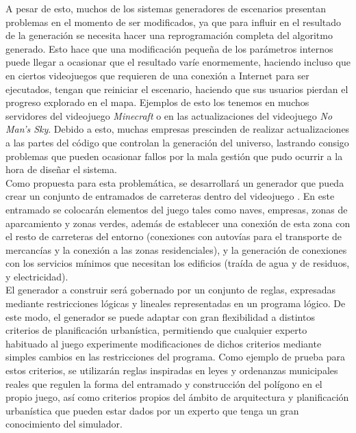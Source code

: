 A pesar de esto, muchos de los sistemas generadores de escenarios presentan problemas en el momento de ser modificados, ya que para influir en el resultado de la generación se necesita hacer una reprogramación completa del algoritmo generado. Esto hace que una modificación pequeña de los parámetros internos puede llegar a ocasionar que el resultado varíe enormemente, haciendo incluso que en ciertos videojuegos que requieren de una conexión a Internet para ser ejecutados, tengan que reiniciar el escenario, haciendo que sus usuarios pierdan el progreso explorado en el mapa. Ejemplos de esto los tenemos en muchos servidores del videojuego \textit{Minecraft} o en las actualizaciones del videojuego \textit{No Man's Sky}. Debido a esto, muchas empresas prescinden de realizar actualizaciones a las partes del código que controlan la generación del universo, lastrando consigo problemas que pueden ocasionar fallos por la mala gestión que pudo ocurrir a la hora de diseñar el sistema. \\

Como propuesta para esta problemática, se desarrollará un generador que pueda crear un conjunto de entramados de carreteras dentro del videojuego \cities. En este entramado se colocarán elementos del juego tales como naves, empresas, zonas de aparcamiento y zonas verdes, además de establecer una conexión de esta zona con el resto de carreteras del entorno (conexiones con autovías para el transporte de mercancías y la conexión a las zonas residenciales), y la generación de conexiones con los servicios mínimos que necesitan los edificios (traída de agua y de residuos, y electricidad). \\

El generador a construir será gobernado por un conjunto de reglas, expresadas mediante restricciones lógicas y lineales representadas en un programa lógico. De este modo, el generador se puede adaptar con gran flexibilidad a distintos criterios de planificación urbanística, permitiendo que cualquier experto habituado al juego experimente modificaciones de dichos criterios mediante simples cambios en las restricciones del programa. Como ejemplo de prueba para estos criterios, se utilizarán reglas inspiradas en leyes y ordenanzas municipales reales \cite{guia_galicia} que regulen la forma del entramado y construcción del polígono en el propio juego, así como criterios propios del ámbito de arquitectura y planificación urbanística que pueden estar dados por un experto que tenga un gran conocimiento del simulador. \\

